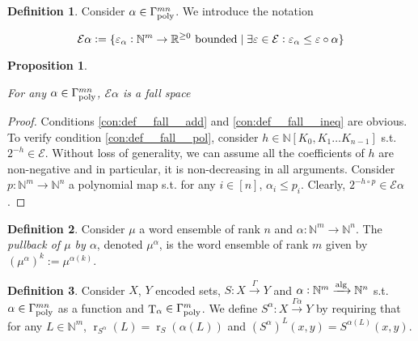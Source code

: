 \documentclass{article}
\numberwithin{equation}{section}
\theoremstyle{definition}
\newtheorem{definition}{Definition}[section]
\theoremstyle{plain}
\newtheorem{proposition}{Proposition}[section]
\DeclareMathOperator{\T}{T}
\DeclareMathOperator{\R}{r}
\newcommand{\Nats}{\mathbb{N}}
\newcommand{\Reals}{\mathbb{R}}
\newcommand{\NatPoly}{\Nats[K_0, K_1 \ldots K_{n-1}]}
\newcommand{\Fall}{\mathcal{E}}
\newcommand{\GammaPoly}{\Gamma_{\textnormal{poly}}}
\newcommand{\Alg}{\xrightarrow{\textnormal{alg}}}
\newcommand{\Scheme}{\xrightarrow{\Gamma}}
\begin{document}
\begin{samepage}
\begin{definition}

Consider ${\alpha \in \GammaPoly^{mn}}$. We introduce the notation

\begin{equation}
\label{eqn:tbd}
\Fall \alpha:=\{\varepsilon_\alpha: \Nats^m \rightarrow \Reals^{\geq 0} \textnormal{ bounded} \mid \exists \varepsilon \in \Fall: \varepsilon_\alpha \leq \varepsilon \circ \alpha\}
\end{equation}

\end{definition}
\end{samepage}

\begin{samepage}
\begin{proposition}
\label{prp:tbd}

For any ${\alpha \in \GammaPoly^{mn}}$, ${\Fall \alpha}$ is a fall space

\end{proposition}
\end{samepage}

\begin{proof}

Conditions \ref{con:def__fall__add} and \ref{con:def__fall__ineq} are obvious. To verify condition \ref{con:def__fall__pol}, consider ${h \in \NatPoly}$ s.t. ${2^{-h} \in \Fall}$. Without loss of generality, we can assume all the coefficients of ${h}$ are non-negative and in particular, it is non-decreasing in all arguments. Consider ${p: \Nats^m \rightarrow \Nats^n}$ a polynomial map s.t. for any ${i \in [n]}$, ${\alpha_i \leq p_i}$. Clearly, ${2^{-h \circ p} \in \Fall \alpha}$.
%
\end{proof}

\begin{samepage}
\begin{definition}

Consider ${\mu}$ a word ensemble of rank ${n}$ and ${\alpha: \Nats^m \rightarrow \Nats^n}$. The \emph{pullback of ${\mu}$ by ${\alpha}$}, denoted ${\mu^\alpha}$, is the word ensemble of rank ${m}$ given by ${(\mu^\alpha)^k:=\mu^{\alpha(k)}}$.

\end{definition}
\end{samepage}

\begin{samepage}
\begin{definition}

Consider ${X}$, ${Y}$ encoded sets, ${S: X \Scheme Y}$ and ${\alpha: \Nats^m \Alg \Nats^n}$ s.t. ${\alpha \in \GammaPoly^{mn}}$ as a function and ${\T_\alpha \in \GammaPoly^m}$. We define ${S^\alpha: X \xrightarrow{\Gamma \alpha} Y}$ by requiring that for any ${L \in \Nats^m}$, ${\R_{S^\alpha}(L)=\R_S(\alpha(L))}$ and ${(S^\alpha)^L(x,y)=S^{\alpha(L)}(x,y)}$.

\end{definition}
\end{samepage}
\end{document}
